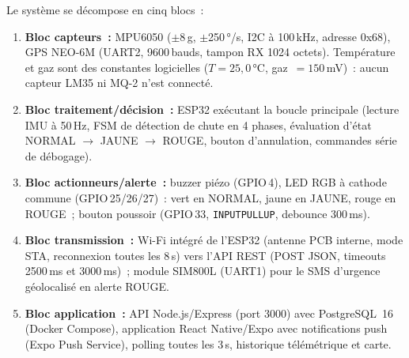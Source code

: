 \documentclass[12pt,a4paper]{article}
\renewcommand{\_}{\textunderscore\allowbreak}
\begin{document}
Le système se décompose en cinq blocs~:

\begin{enumerate}
    \item \textbf{Bloc capteurs~:} MPU6050 ($\pm$8\,g, $\pm$250\,°/s, I2C à 100\,kHz, adresse 0x68), GPS NEO-6M (UART2, 9600\,bauds, tampon RX 1024 octets). Température et gaz sont des constantes logicielles ($T = 25{,}0$\,°C, gaz~$= 150$\,mV)~: aucun capteur LM35 ni MQ-2 n'est connecté.

    \item \textbf{Bloc traitement/décision~:} ESP32 exécutant la boucle principale (lecture IMU à 50\,Hz, FSM de détection de chute en 4 phases, évaluation d'état NORMAL $\rightarrow$ JAUNE $\rightarrow$ ROUGE, bouton d'annulation, commandes série de débogage).

    \item \textbf{Bloc actionneurs/alerte~:} buzzer piézo (GPIO\,4), LED RGB à cathode commune (GPIO\,25/26/27)~: vert en NORMAL, jaune en JAUNE, rouge en ROUGE~; bouton poussoir (GPIO\,33, \texttt{INPUT\_PULLUP}, debounce 300\,ms).

    \item \textbf{Bloc transmission~:} Wi-Fi intégré de l'ESP32 (antenne PCB interne, mode STA, reconnexion toutes les 8\,s) vers l'API REST (POST JSON, timeouts 2500\,ms et 3000\,ms)~; module SIM800L (UART1) pour le SMS d'urgence géolocalisé en alerte ROUGE.

    \item \textbf{Bloc application~:} API Node.js/Express (port 3000) avec PostgreSQL~16 (Docker Compose), application React Native/Expo avec notifications push (Expo Push Service), polling toutes les 3\,s, historique télémétrique et carte.
\end{enumerate}
\end{document}
